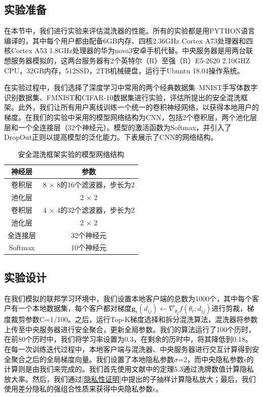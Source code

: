 \subsection{实验准备}
在本节中，我们进行实验来评估混洗器的性能。所有的实验都是用PYTHON语言编译的，其中每个用户都由配备6GB内存、四核2.36GHz Cortex A73处理器和四核Cortex A53 1.8GHz处理器的华为nova3安卓手机代替。中央服务器是用两台联想服务器模拟的，这两台服务器有2个英特尔（R）至强（R）E5-2620 2.10GHZ CPU，32GB内存，512SSD，2TB机械硬盘，运行于Ubuntu 18.04操作系统。

在实验过程中，我们选择了深度学习中常用的两个经典数据集--MNIST手写体数字识别数据集、FMNIST和CIFAR-10数据集进行实验，评估所提出的安全混洗框架。此外，我们让所有用户离线训练一个统一的卷积神经网络，以获得本地用户的梯度。在我们的实验中采用的模型网络结构为CNN，包括2个卷积层，两个池化层层和一个全连接层（32个神经元）。模型的激活函数为Softmax，并引入了DropOut正则以提高模型的泛化能力。下表展示了CNN的网络结构。

\begin{table}[H]
	\centering
	\begin{tabular}{cc}
		\hline
		神经层& 参数\\
		\hline
		卷积层& 8 × 8的16个滤波器，步长为2\\
		池化层& 2 × 2\\
		卷积层& 4 × 4的32个滤波器，步长为2\\
		池化层& 2 × 2\\
		全连接层& 32个神经元\\
		Softmax& 10个神经元\\
		\hline
	\end{tabular}
	\caption{安全混洗框架实验的模型网络结构}
	\label{tab1}
\end{table}

\subsection{实验设计}
在我们模拟的联邦学习环境中，我们设置本地客户端的总数为1000个，其中每个客户有一个本地数据集，每个客户都对梯度$\mathbf{g}_{t}\left(d_{i j}\right) \leftarrow \nabla_{\theta_{t}} f\left(\theta_{t} ; d_{i j}\right)$进行剪裁，梯度裁剪参数C=1/100。之后，运行Top-K梯度选择和拆分混洗算法，混洗器将参数上传至中央服务器进行安全聚合，更新全局参数。我们的算法运行了100个历时，在前80个历时中，我们将学习率设置为0.3，在剩余的历时中，将其降低到0.18。在每一次训练迭代过程中，本地客户端与混洗器、中央服务器进行交互计算得到安全聚合之后的全局梯度向量。我们设置了本地隐私参数$\sigma$=2，而中央隐私参数$\epsilon$的计算则是由我们来完成的。我们首先使用文献中的定理5.3通过洗牌数值计算隐私放大率。然后，我们通过\ref{隐私性证明}中提出的子抽样计算隐私放大；最后，我们使用差分隐私的强组合性质来获得中央隐私参数$\epsilon$。

